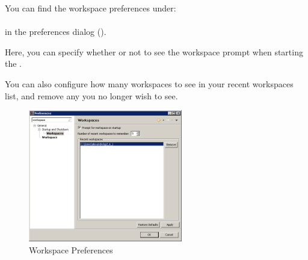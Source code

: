 You can find the workspace preferences under:\\
\\
in the preferences dialog ().

Here, you can specify whether or not to see the workspace prompt when starting the \ite{}. 

You can also configure how many workspaces to see in your recent workspaces list, and remove any you no longer wish to see. 


\begin{figure}[h]
\begin{center}
\includegraphics[width=0.60\textwidth]{Tasks/Preferences/PS/workspaceprefs}
\caption{Workspace Preferences}
\label{WorkspacePrefs}
\end{center}
\end{figure}
